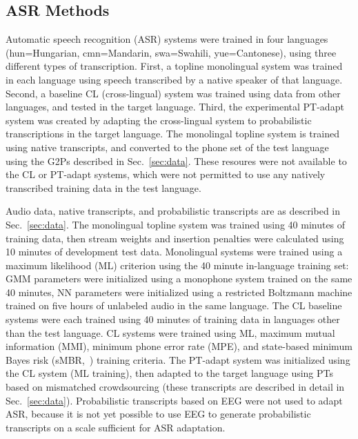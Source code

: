 \subsection{ASR Methods}
\label{sec:mlbaseline}

{\color{blue} Automatic speech recognition (ASR) systems were trained
  in four languages (hun=Hungarian, cmn=Mandarin, swa=Swahili,
  yue=Cantonese), using three different types of transcription.
  First, a topline {\sc monolingual} system was trained in each
  language using speech transcribed by a native speaker of that
  language.  Second, a baseline {\sc CL} (cross-lingual) system was
  trained using data from other languages, and tested in the target
  language.  Third, the experimental {\sc PT-adapt} system was created
  by adapting the cross-lingual system to probabilistic transcriptions
  in the target language.  The {\sc monolingal} topline system is
  trained using native transcripts, and converted to the phone set of
  the test language using the G2Ps described in Sec.~\ref{sec:data}.
  These resoures were not available to the {\sc CL} or {\sc PT-adapt}
  systems, which were not permitted to use any natively transcribed
  training data in the test language.}

{\color{blue} Audio data, native transcripts, and probabilistic
  transcripts are as described in Sec.~\ref{sec:data}.  The {\sc
    monolingual} topline system was trained using 40 minutes of
  training data, then stream weights and insertion penalties were
  calculated using 10 minutes of development test data.  Monolingual
  systems were trained using a maximum likelihood (ML) criterion using
  the 40 minute in-language training set: GMM parameters were
  initialized using a monophone system trained on the same 40 minutes,
  NN parameters were initialized using a restricted Boltzmann machine
  trained on five hours of unlabeled audio in the same language.  The
  {\sc CL} baseline systems were each trained using 40 minutes of
  training data in languages other than the test language.  CL systems
  were trained using ML, maximum mutual information (MMI), minimum
  phone error rate (MPE), and state-based minimum Bayes risk
  (sMBR,~\cite{Gibson06}) training criteria.  The {\sc PT-adapt}
  system was initialized using the CL system (ML training), then
  adapted to the target language using PTs based on mismatched
  crowdsourcing (these transcripts are described in detail in
  Sec.~\ref{sec:data}).  Probabilistic transcripts based on EEG were
  not used to adapt ASR, because it is not yet possible to use EEG to
  generate probabilistic transcripts on a scale sufficient for ASR
  adaptation.}

